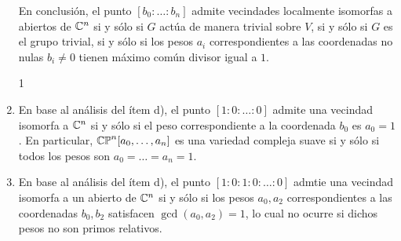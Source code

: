 \begin{solution}
\begin{enumerate}[label=\alph*)]
    En conclusión, el punto $[b_0 : \dots : b_n]$ admite vecindades localmente isomorfas a abiertos de $\mathbb C^n$ si y sólo si $G$ actúa de manera trivial sobre $V$, si y sólo si $G$ es el grupo trivial, si y sólo si los pesos $a_i$ correspondientes a las coordenadas no nulas $b_i \ne 0$ tienen máximo común divisor igual a $1$.
    
    \setcounter {enumi} 1
    
    \item En base al análisis del ítem d), el punto $[1 : 0 : \dots : 0]$ admite una vecindad isomorfa a $\mathbb C^n$ si y sólo si el peso correspondiente a la coordenada $b_0$ es $a_0 = 1$. En particular, $\mathbb {CP}^n[a_0, \dots, a_n]$ es una variedad compleja suave si y sólo si todos los pesos son $a_0 = \dots = a_n = 1$.
    
    \item En base al análisis del ítem d), el punto $[1 : 0 : 1 : 0 : \dots : 0]$ admtie una vecindad isomorfa a un abierto de $\mathbb C^n$ si y sólo si los pesos $a_0, a_2$ correspondientes a las coordenadas $b_0, b_2$ satisfacen $\gcd(a_0, a_2) = 1$, lo cual no ocurre si dichos pesos no son primos relativos.
\end{enumerate}
\end{solution}
